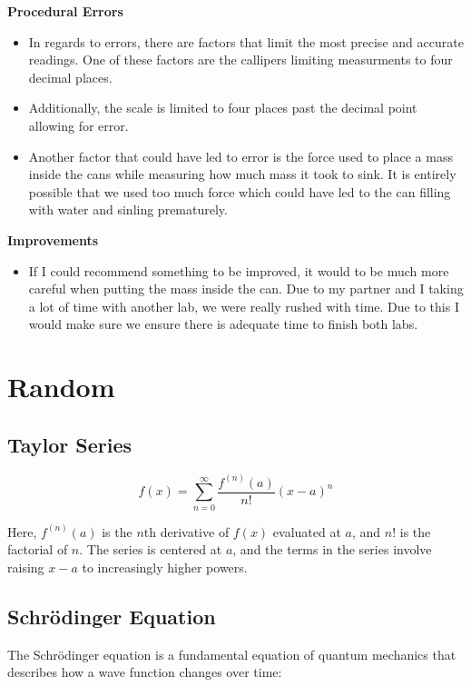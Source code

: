     \noindent \textbf{Procedural Errors}
    \begin{itemize}
      \item In regards to errors, there are factors that limit the most precise and 
            accurate readings. One of these factors are the callipers limiting measurments
            to four decimal places.
      \item Additionally, the scale is limited to four places past the decimal point
            allowing for error.
      \item Another factor that could have led to error is the force used to place a mass
            inside the cans while measuring how much mass it took to sink. It is entirely
            possible that we used too much force which could have led to the can filling with water
            and sinling prematurely.
    \end{itemize}

    \noindent \textbf{Improvements}
    \begin{itemize}
      \item If I could recommend something to be improved, it would to be much more
            careful when putting the mass inside the can. Due to my partner and I taking
            a lot of time with another lab, we were really rushed with time. Due to this
            I would make sure we ensure there is adequate time to finish both labs.
    \end{itemize}

    \chapter*{Random}

    \section*{Taylor Series}
    $$f(x) = \sum_{n=0}^{\infty} \frac{f^{(n)}(a)}{n!} (x-a)^n$$

    \noindent Here, $f^{(n)}(a)$ is the $n$th derivative of $f(x)$ evaluated at $a$, and $n!$ is the factorial of $n$. 
    The series is centered at $a$, and the terms in the series involve raising $x-a$ to increasingly higher powers.

    \section*{Schrödinger Equation}

    \noindent The Schrödinger equation is a fundamental equation of quantum mechanics 
    that describes how a wave function changes over time:

